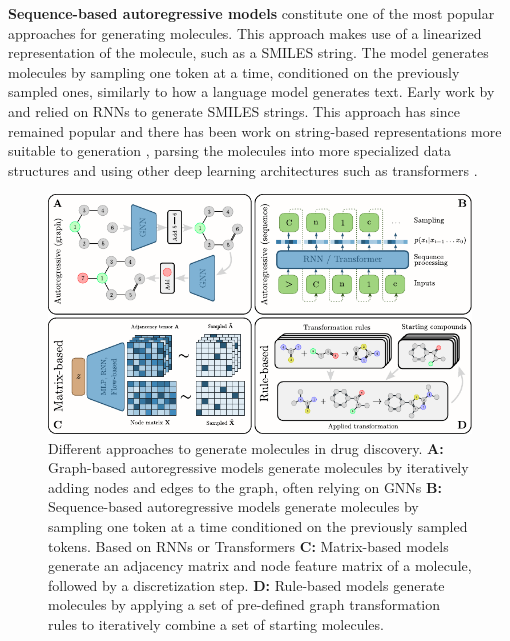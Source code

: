 \textbf{Sequence-based autoregressive models} constitute one of the most popular approaches for
generating molecules. This approach makes use of a linearized representation of the molecule, such
as a SMILES string. The model generates molecules by sampling one token at a time,
conditioned on the previously sampled ones, similarly to how a language model generates text.
Early work by \citep{seglerGeneratingFocusedMolecule2018} and
\citep{gomez-bombarelliAutomaticChemicalDesign2018} relied on \acp{RNN} to
generate SMILES strings. This approach has since remained popular and there has been work on
string-based representations more suitable to generation
\citep{oboyleDeepSMILESAdaptationSMILES2018,krennSelfReferencingEmbeddedStrings2020,noutahiGottaBeSAFE2023},
parsing the molecules into more specialized data structures
\citep{kusnerGrammarVariationalAutoencoder2017,jinJunctionTreeVariational2018} and using other deep
learning architectures such as transformers
\citep{vaswaniAttentionAllYou2017,noutahiGottaBeSAFE2023,schwallerMolecularTransformerModel2019,bagalMolGPTMolecularGeneration2022,mazuzMoleculeGenerationUsing2023}.

\begin{figure}
    \centering
    \includegraphics[width=\textwidth]{figures/generation_strategies_tryout.pdf}
    \caption{Different approaches to generate molecules in drug discovery. \textbf{A:} Graph-based
        autoregressive models generate molecules by iteratively adding nodes and edges to the
        graph, often relying on \acp{GNN} \textbf{B:} Sequence-based autoregressive models
        generate molecules by sampling one token at a time conditioned on the previously sampled
        tokens. Based on \acp{RNN} or Transformers \textbf{C:} Matrix-based models generate an
        adjacency matrix and node feature matrix of a molecule, followed by a discretization
        step. \textbf{D:} Rule-based models generate molecules by applying a set of pre-defined
        graph transformation rules to iteratively combine a set of starting molecules.
        \label{fig:generation-strategies}}
\end{figure}

